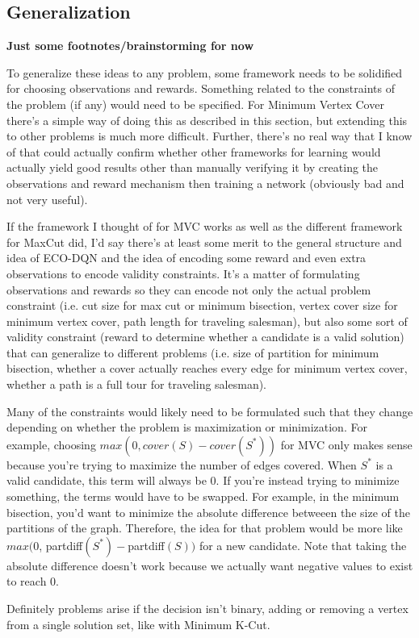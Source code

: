 \documentclass{article}
\begin{document}
\subsection{Generalization}

\textbf{Just some footnotes/brainstorming for now}

To generalize these ideas to any problem, some framework needs to be solidified for choosing observations and rewards. Something related to the constraints of the problem (if any) would need to be specified. For Minimum Vertex Cover there's a simple way of doing this as described in this section, but extending this to other problems is much more difficult. Further, there's no real way that I know of that could actually confirm whether other frameworks for learning would actually yield good results other than manually verifying it by creating the observations and reward mechanism then training a network (obviously bad and not very useful).

If the framework I thought of for MVC works as well as the different framework for MaxCut did, I'd say there's at least some merit to the general structure and idea of ECO-DQN and the idea of encoding some reward and even extra observations to encode validity constraints. It's a matter of formulating observations and rewards so they can encode not only the actual problem constraint (i.e. cut size for max cut or minimum bisection, vertex cover size for minimum vertex cover, path length for traveling salesman), but also some sort of validity constraint (reward to determine whether a candidate is a valid solution) that can generalize to different problems (i.e. size of partition for minimum bisection, whether a cover actually reaches every edge for minimum vertex cover, whether a path is a full tour for traveling salesman).

Many of the constraints would likely need to be formulated such that they change depending on whether the problem is maximization or minimization. For example, choosing $max(0, cover(S) - cover(S^*))$ for MVC only makes sense because you're trying to maximize the number of edges covered. When $S^*$ is a valid candidate, this term will always be 0. If you're instead trying to minimize something, the terms would have to be swapped. For example, in the minimum bisection, you'd want to minimize the absolute difference betweeen the size of the partitions of the graph. Therefore, the idea for that problem would be more like $max(0$, partdiff$(S^*) - $partdiff$(S))$ for a new candidate. Note that taking the absolute difference doesn't work because we actually want negative values to exist to reach 0.

Definitely problems arise if the decision isn't binary, adding or removing a vertex from a single solution set, like with Minimum K-Cut.



\end{document}
